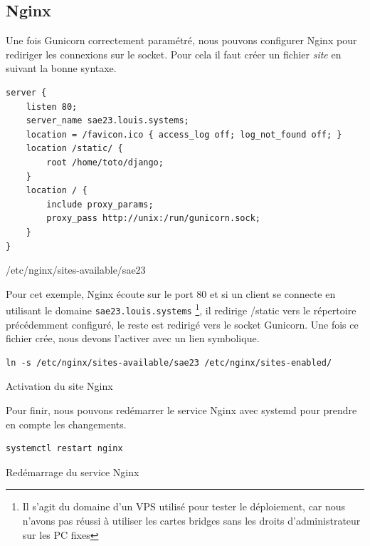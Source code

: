\documentclass{article}
\begin{document}
        \subsection{Nginx}
        Une fois Gunicorn correctement paramétré, nous pouvons configurer Nginx pour rediriger les connexions sur le socket. Pour cela il faut créer un fichier \emph{site} en suivant la bonne syntaxe.
        \begin{listing}[H]
            \begin{verbatim}
server {
    listen 80;
    server_name sae23.louis.systems;
    location = /favicon.ico { access_log off; log_not_found off; }
    location /static/ {
        root /home/toto/django;
    }
    location / {
        include proxy_params;
        proxy_pass http://unix:/run/gunicorn.sock;
    }
}
            \end{verbatim}
            \caption{/etc/nginx/sites-available/sae23}
            \label{code:sae23-site} 
        \end{listing}
        Pour cet exemple, Nginx écoute sur le port 80 et si un client se connecte en utilisant le domaine \verb|sae23.louis.systems|
        \footnote{Il s'agit du domaine d'un VPS utilisé pour tester le déploiement, car nous n'avons pas réussi à utiliser les cartes bridges sans les droits d'administrateur sur les PC fixes},
        il redirige /static vers le répertoire précédemment configuré, le reste est redirigé vers le socket Gunicorn.
        Une fois ce fichier crée, nous devons l'activer avec un lien symbolique.
        \begin{listing}[H]
            \begin{verbatim}
ln -s /etc/nginx/sites-available/sae23 /etc/nginx/sites-enabled/
            \end{verbatim}
            \caption{Activation du site Nginx}
            \label{code:nginx-site-active} 
        \end{listing}
        Pour finir, nous pouvons redémarrer le service Nginx avec systemd pour prendre en compte les changements.
        \begin{listing}[H]
            \begin{verbatim}
systemctl restart nginx
            \end{verbatim}
            \caption{Redémarrage du service Nginx}
            \label{code:nginx-restart} 
        \end{listing}
    
\end{document}
